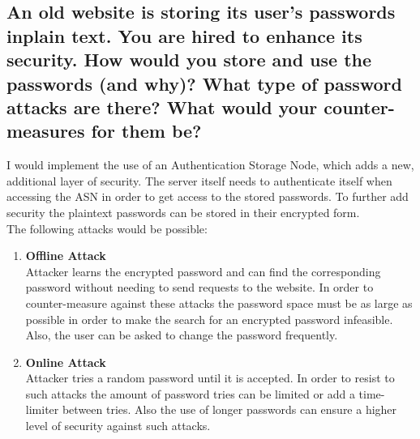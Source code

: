 \documentclass{report}
\begin{document}
		\subsection{An old website is storing its user’s passwords inplain text. You are hired to enhance its security. How would you store and use the passwords (and why)? What type of password attacks are there? What would your counter-measures for them be?}
		\startsubsection
			I would implement the use of an Authentication Storage Node, which adds a new, additional layer of security. The server itself needs to authenticate itself when accessing the ASN in order to get access to the stored passwords. To further add security the plaintext passwords can be stored in their encrypted form. \\
			The following attacks would be possible:
			\begin{enumerate}[-]
				\item \textbf{Offline Attack} \\
				Attacker learns the encrypted password and can find the corresponding password without needing to send requests to the website. In order to counter-measure against these attacks the password space must be as large as possible in order to make the search for an encrypted password infeasible. Also, the user can be asked to change the password frequently.
				\item \textbf{Online Attack} \\
				Attacker tries a random password until it is accepted. In order to resist to such attacks the amount of password tries can be limited or add a time-limiter between tries. Also the use of longer passwords can ensure a higher level of security against such attacks.
			\end{enumerate}
		\closesection
		
\end{document}
